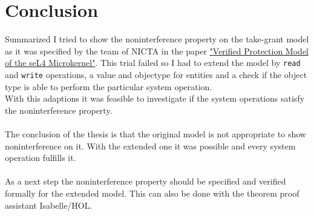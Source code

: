 \section{Conclusion}
Summarized I tried to show the noninterference property on the take-grant model as it was specified by the team of NICTA in the paper \href{http://ts.data61.csiro.au/publications/nicta_full_text/1474.pdf}{%
		"Verified Protection Model of the seL4 Microkernel"}\cite{TakeG}. This trial failed so I had to extend the model by \texttt{read} and \texttt{write} operations, a value and objectype for entities and a check if the object type is able to perform the particular system operation. \\
		With this adaptions it was feasible to investigate if the system operations satisfy the noninterference property. \\ \\
		The conclusion of the thesis is that the original model is not appropriate to show noninterference on it. With the extended one it was possible and every system operation fulfills it. \\ \\
		As a next step the noninterference property should be specified and verified formally for the extended model. This can also be done with the theorem proof assistant Isabelle/HOL.  